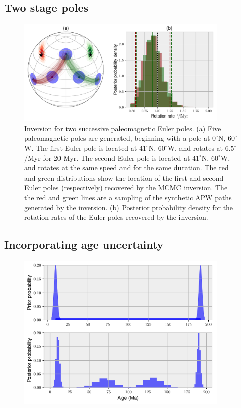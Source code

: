 \documentclass[preprint,12pt,authoryear]{elsarticle}
\begin{document}
\subsection{Two stage poles}
\begin{figure}
\includegraphics[width=0.9\textwidth]{figures/synthetic/two_euler_poles.pdf}
\caption[Inversion for two successive paleomagnetic Euler poles.]{Inversion for two successive paleomagnetic Euler poles. (a) Five paleomagnetic poles are generated, beginning with a pole at $0^\circ$N, $60^\circ$W. The first Euler pole is located at $41^\circ$N, $60^\circ$W, and rotates at $6.5^\circ$/Myr for 20 Myr. The second Euler pole is located at $41^\circ$N, $60^\circ$W, and rotates at the same speed and for the same duration. The red and green distributions show the location of the first and second Euler poles (respectively) recovered by the MCMC inversion. The the red and green lines are a sampling of the synthetic APW paths generated by the inversion. (b) Posterior probability density for the rotation rates of the Euler poles recovered by the inversion.}
\label{fig:two_euler_poles}
\end{figure}


\subsection{Incorporating age uncertainty}
\begin{figure}
\includegraphics[width=0.9\textwidth]{figures/synthetic/age_uncertainty_samples.pdf}
\caption{}
\label{fig:age_uncertainty_samples}
\end{figure}
\end{document}

